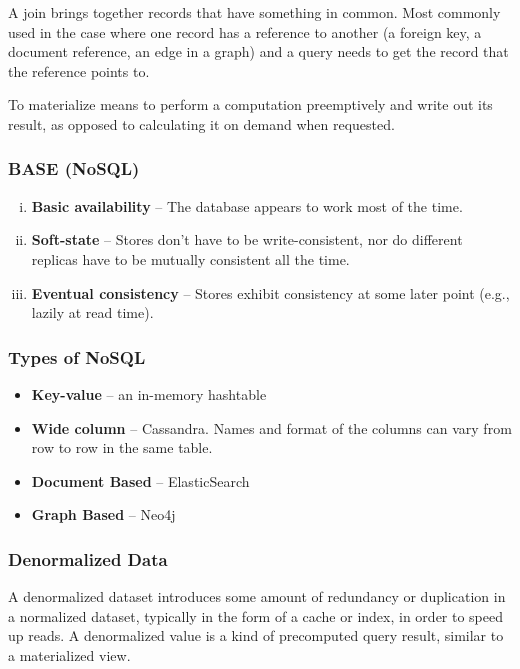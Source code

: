 \documentclass{article}
\begin{document}
    A join brings together records that have something in common. Most commonly used in the case where one record has a reference to another (a foreign key, a document reference, an edge in a graph) and a query needs to get the record that the reference points to.
    
    To materialize means to perform a computation preemptively and write out its result, as opposed to calculating it on demand when requested.
    
    \subsubsection{BASE (NoSQL)}
    \begin{enumerate}[i.]
        \item \textbf{Basic availability} -- The database appears to work most of the time.
        \item \textbf{Soft-state} -- Stores don’t have to be write-consistent, nor do different replicas have to be mutually consistent all the time.
        \item \textbf{Eventual consistency} -- Stores exhibit consistency at some later point (e.g., lazily at read time).
    \end{enumerate}
    
    \subsubsection{Types of NoSQL}
    \begin{itemize}
        \item \textbf{Key-value} -- an in-memory hashtable 
        \item \textbf{Wide column} -- Cassandra. Names and format of the columns can vary from row to row in the same table.
        \item \textbf{Document Based} -- ElasticSearch
        \item \textbf{Graph Based} -- Neo4j
    \end{itemize}
    
    \subsubsection{Denormalized Data}
    A denormalized dataset introduces some amount of redundancy or duplication in a normalized dataset, typically in the form of a cache or index, in order to speed up reads. A  denormalized value is a kind of precomputed query result, similar to a materialized view.
    
\end{document}
